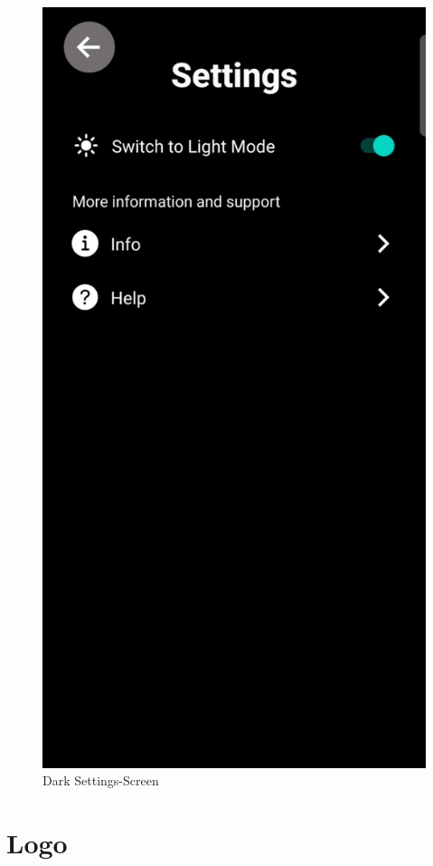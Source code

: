 \begin{figure}[H]
\begin{minipage}{0.5\textwidth}
        \includegraphics[height=1.4\textwidth]{./pics/dSettings.jpg}
        \caption{Dark Settings-Screen}
    \end{minipage}
\end{figure}

\section{Logo}

